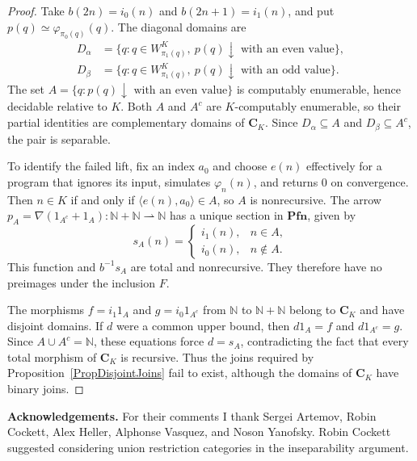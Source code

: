 \documentclass[letterpaper,10pt]{amsart}
\theoremstyle{plain}
\theoremstyle{definition}
\begin{document}
\begin{proof}
Take $b(2n)=i_0(n)$ and $b(2n+1)=i_1(n)$, and put
$p(q)\simeq\varphi_{\pi_0(q)}(q)$. The diagonal domains are
\[
\begin{aligned}
D_\alpha&=\{q:q\in W_{\pi_1(q)}^K,\ p(q)\downarrow
                   \text{ with an even value}\},\\
D_\beta&=\{q:q\in W_{\pi_1(q)}^K,\ p(q)\downarrow
                   \text{ with an odd value}\}.
\end{aligned}
\]
The set $A=\{q:p(q)\downarrow\text{ with an even value}\}$ is
computably enumerable, hence decidable relative to $K$. Both $A$ and
$A^c$ are $K$-computably enumerable, so their partial identities are
complementary domains of $\mathbf C_K$. Since
$D_\alpha\subseteq A$ and $D_\beta\subseteq A^c$, the pair is separable.

To identify the failed lift, fix an index $a_0$ and choose $e(n)$
effectively for a program that ignores its input, simulates
$\varphi_n(n)$, and returns $0$ on convergence. Then
$n\in K$ if and only if $\langle e(n),a_0\rangle\in A$, so $A$ is
nonrecursive. The arrow
$p_A=\nabla(1_{A^c}+1_A):\mathbb N+\mathbb N\rightharpoonup\mathbb N$
has a unique section in $\mathbf{Pfn}$, given by
\[
s_A(n)=
\begin{cases}
i_1(n),&n\in A,\\
i_0(n),&n\notin A.
\end{cases}
\]
This function and $b^{-1}s_A$ are total and nonrecursive. They therefore
have no preimages under the inclusion $F$.

The morphisms $f=i_1 1_A$ and $g=i_0 1_{A^c}$ from $\mathbb N$ to
$\mathbb N+\mathbb N$ belong to $\mathbf C_K$ and have disjoint
domains. If $d$ were a common upper bound, then $d1_A=f$ and
$d1_{A^c}=g$. Since $A\cup A^c=\mathbb N$, these equations force
$d=s_A$, contradicting the fact that every total morphism of
$\mathbf C_K$ is recursive. Thus the joins required by
Proposition~\ref{PropDisjointJoins} fail to exist, although the domains
of $\mathbf C_K$ have binary joins.
\end{proof}

\bigskip
\noindent\textbf{Acknowledgements.}
For their comments I thank Sergei Artemov, Robin Cockett, Alex Heller,
Alphonse Vasquez, and Noson Yanofsky. Robin Cockett suggested considering
union restriction categories in the inseparability argument.
\end{document}

